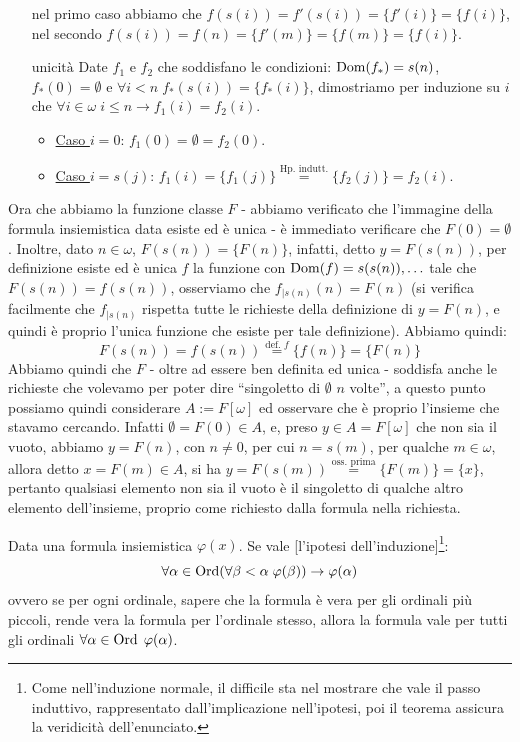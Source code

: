 \begin{soln}
\begin{itemize}
		nel primo caso abbiamo che $f(s(i)) = f'(s(i)) = \{f'(i)\} = \{f(i)\}$, nel secondo $f(s(i)) = f(n) = \{f'(m)\} = \{f(m)\} = \{f(i)\}$.
		\item[$\boxed{\text{unicità}}$] Date $f_1$ e $f_2$ che soddisfano le condizioni: $\operatorname{Dom}(f_*) = s(n)$, $f_*(0) = \emptyset$ e $\forall i < n \; f_*(s(i)) = \{f_*(i)\}$, dimostriamo per induzione su $i$ che $\forall i \in \omega \; i \leq n \to f_1(i) = f_2(i)$.
		\begin{itemize}
			\item \underline{Caso $i = 0$}: $f_1(0) = \emptyset = f_2(0)$.
			\item \underline{Caso $i = s(j)$}: $f_1(i) = \{f_1(j)\} \overset{\text{Hp. indutt.}}{=} \{f_2(j)\} = f_2(i)$.
		\end{itemize}
	\end{itemize}
	Ora che abbiamo la funzione classe $F$ - abbiamo verificato che l'immagine della formula insiemistica data esiste ed è unica - è immediato verificare che $F(0) = \emptyset$. Inoltre, dato $n \in \omega$, $F(s(n)) = \{F(n)\}$, infatti, detto $y = F(s(n))$,
	per definizione esiste ed è unica $f$ la funzione con $\operatorname{Dom}(f) = s(s(n)),\ldots$ tale che $F(s(n)) = f(s(n))$, osserviamo che $f_{|s(n)}(n) = F(n)$ (si verifica facilmente che $f_{|s(n)}$ rispetta tutte le richieste della definizione di $y = F(n)$, e quindi è proprio l'unica funzione che esiste per tale definizione). Abbiamo quindi:
	\[ F(s(n)) = f(s(n)) \overset{\text{def. $f$}}{=} \{f(n)\} = \{F(n)\}
		\]
	Abbiamo quindi che $F$ - oltre ad essere ben definita ed unica - soddisfa anche le richieste che volevamo per poter dire ``singoletto di $\emptyset$ $n$ volte'', a questo punto possiamo quindi considerare
	$A:=F[\omega]$ ed osservare che è proprio l'insieme che stavamo cercando. Infatti $\emptyset = F(0) \in A$, e, preso $y \in A = F[\omega]$ che non sia il vuoto, abbiamo $y = F(n)$, con $n \ne 0$, per cui $n = s(m)$,
	per qualche $m \in \omega$, allora detto $x = F(m) \in A$, si ha $y = F(s(m)) \overset{\text{oss. prima}}{=} \{F(m)\} = \{x\}$, pertanto qualsiasi elemento non sia il vuoto 
	è il singoletto di qualche altro elemento dell'insieme, proprio come richiesto dalla formula nella richiesta.
\end{soln}

\begin{proposition}
	\label{induz_transf1}
	Data una formula insiemistica $\varphi(x)$. Se vale [l'ipotesi dell'induzione]\footnote{Come nell'induzione normale, il difficile sta nel mostrare che vale il passo induttivo, rappresentato dall'implicazione nell'ipotesi, poi il teorema assicura la veridicità dell'enunciato.}:
	\[ \forall \alpha \in \operatorname{Ord}(\forall \beta < \alpha \; \varphi(\beta))\rightarrow \varphi(\alpha)
		\]
	ovvero se per ogni ordinale, sapere che la formula è vera per gli ordinali più piccoli, rende vera la formula per l'ordinale stesso, allora la formula vale per tutti gli ordinali $\forall \alpha \in \operatorname{Ord} \; \varphi(\alpha)$.
\end{proposition}


